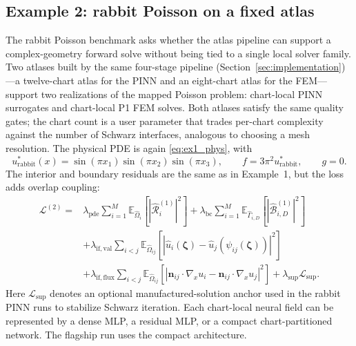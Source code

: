 \documentclass[sort&compress]{svjour3} %
\begin{document}
\subsection{Example 2: rabbit Poisson on a fixed atlas}
\label{sec:example2}
The rabbit Poisson benchmark asks whether the atlas pipeline can support a complex-geometry forward solve without being tied to a single local solver family. Two atlases built by the same four-stage pipeline (Section~\ref{sec:implementation})---a twelve-chart atlas for the PINN and an eight-chart atlas for the FEM---support two realizations of the mapped Poisson problem: chart-local PINN surrogates and chart-local P1 FEM solves. Both atlases satisfy the same quality gates; the chart count is a user parameter that trades per-chart complexity against the number of Schwarz interfaces, analogous to choosing a mesh resolution. The physical PDE is again \eqref{eq:ex1_phys}, with
\begin{equation}
u^{\ast}_{\mathrm{rabbit}}(x)=\sin(\pi x_1)\sin(\pi x_2)\sin(\pi x_3),
\qquad
f=3\pi^2 u^{\ast}_{\mathrm{rabbit}},
\qquad
g=0.
\label{eq:rabbit_poisson_exact}
\end{equation}
The interior and boundary residuals are the same as in Example~1, but the loss adds overlap coupling:
\begin{align}
\mathcal{L}^{(2)}
=&
\lambda_{\mathrm{pde}}\sum_{i=1}^{M}\mathbb{E}_{\widehat{\Omega}_i}
\left[\left|\widehat{\mathcal{R}}^{(1)}_i\right|^2\right]
+
\lambda_{\mathrm{bc}}\sum_{i=1}^{M}\mathbb{E}_{\widehat{\Gamma}_{i,D}}
\left[\left|\widehat{\mathcal{B}}^{(1)}_{i,D}\right|^2\right]
\nonumber\\
&+
\lambda_{\mathrm{if,val}}\sum_{i<j}\mathbb{E}_{\widehat{\Omega}_{ij}}
\left[
\left|
\widehat{u}_i(\boldsymbol{\zeta})-\widehat{u}_j(\psi_{ij}(\boldsymbol{\zeta}))
\right|^2
\right]
\nonumber\\
&+
\lambda_{\mathrm{if,flux}}\sum_{i<j}\mathbb{E}_{\widehat{\Omega}_{ij}}
\left[
\left|
\mathbf{n}_{ij}\cdot \nabla_x u_i - \mathbf{n}_{ij}\cdot \nabla_x u_j
\right|^2
\right]
+
\lambda_{\mathrm{sup}}\mathcal{L}_{\mathrm{sup}}.
\label{eq:rabbit_poisson_loss}
\end{align}
Here $\mathcal{L}_{\mathrm{sup}}$ denotes an optional manufactured-solution anchor used in the rabbit PINN runs to stabilize Schwarz iteration. Each chart-local neural field can be represented by a dense MLP, a residual MLP, or a compact chart-partitioned network. The flagship run uses the compact architecture.
\end{document}
